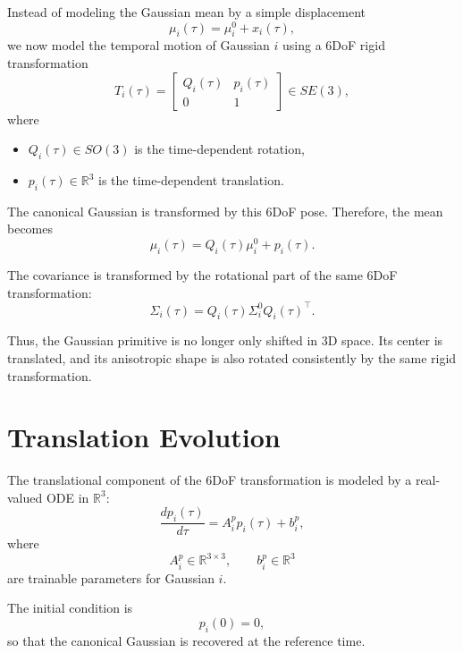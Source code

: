 \documentclass[11pt]{article}
\begin{document}
Instead of modeling the Gaussian mean by a simple displacement
\begin{equation}
\mu_i(\tau)=\mu_i^0+x_i(\tau),
\end{equation}
we now model the temporal motion of Gaussian $i$ using a 6DoF rigid transformation
\begin{equation}
T_i(\tau) =
\begin{bmatrix}
Q_i(\tau) & p_i(\tau)\\
0 & 1
\end{bmatrix}
\in SE(3),
\end{equation}
where
\begin{itemize}[leftmargin=1.5em]
\item $Q_i(\tau)\in SO(3)$ is the time-dependent rotation,
\item $p_i(\tau)\in\mathbb{R}^3$ is the time-dependent translation.
\end{itemize}

The canonical Gaussian is transformed by this 6DoF pose. Therefore, the mean becomes
\begin{equation}
\mu_i(\tau) = Q_i(\tau)\mu_i^0+p_i(\tau).
\end{equation}

The covariance is transformed by the rotational part of the same 6DoF transformation:
\begin{equation}
\Sigma_i(\tau) = Q_i(\tau)\Sigma_i^0 Q_i(\tau)^\top.
\end{equation}

Thus, the Gaussian primitive is no longer only shifted in 3D space. Its center is translated, and its anisotropic shape is also rotated consistently by the same rigid transformation.

\section{Translation Evolution}

The translational component of the 6DoF transformation is modeled by a real-valued ODE in $\mathbb{R}^3$:
\begin{equation}
\frac{dp_i(\tau)}{d\tau} = A_i^p p_i(\tau)+b_i^p,
\end{equation}
where
\begin{equation}
A_i^p\in\mathbb{R}^{3\times 3},
\qquad
b_i^p\in\mathbb{R}^3
\end{equation}
are trainable parameters for Gaussian $i$.

The initial condition is
\begin{equation}
p_i(0)=0,
\end{equation}
so that the canonical Gaussian is recovered at the reference time.
\end{document}
